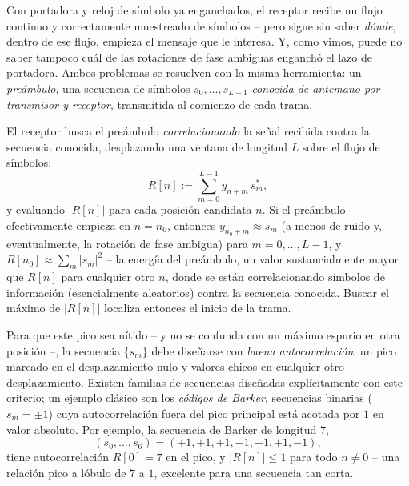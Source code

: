 Con portadora y reloj de símbolo ya enganchados, el receptor recibe un flujo continuo y correctamente muestreado de símbolos -- pero sigue sin saber \emph{dónde}, dentro de ese flujo, empieza el mensaje que le interesa. Y, como vimos, puede no saber tampoco cuál de las rotaciones de fase ambiguas enganchó el lazo de portadora. Ambos problemas se resuelven con la misma herramienta: un \emph{preámbulo}, una secuencia de símbolos $s_0,\ldots,s_{L-1}$ \emph{conocida de antemano por transmisor y receptor}, transmitida al comienzo de cada trama.

El receptor busca el preámbulo \emph{correlacionando} la señal recibida contra la secuencia conocida, desplazando una ventana de longitud $L$ sobre el flujo de símbolos:
\begin{equation*}
    R[n] := \sum_{m=0}^{L-1} y_{n+m}\, s_m^*,
\end{equation*}
y evaluando $|R[n]|$ para cada posición candidata $n$. Si el preámbulo efectivamente empieza en $n=n_0$, entonces $y_{n_0+m}\approx s_m$ (a menos de ruido y, eventualmente, la rotación de fase ambigua) para $m=0,\ldots,L-1$, y $R[n_0]\approx\sum_m |s_m|^2$ -- la energía del preámbulo, un valor sustancialmente mayor que $R[n]$ para cualquier otro $n$, donde se están correlacionando símbolos de información (esencialmente aleatorios) contra la secuencia conocida. Buscar el máximo de $|R[n]|$ localiza entonces el inicio de la trama.

Para que este pico sea nítido -- y no se confunda con un máximo espurio en otra posición --, la secuencia $\{s_m\}$ debe diseñarse con \emph{buena autocorrelación}: un pico marcado en el desplazamiento nulo y valores chicos en cualquier otro desplazamiento. Existen familias de secuencias diseñadas explícitamente con este criterio; un ejemplo clásico son los \emph{códigos de Barker}, secuencias binarias ($s_m=\pm 1$) cuya autocorrelación fuera del pico principal está acotada por $1$ en valor absoluto. Por ejemplo, la secuencia de Barker de longitud $7$,
\begin{equation*}
    (s_0,\ldots,s_6) = (+1,+1,+1,-1,-1,+1,-1),
\end{equation*}
tiene autocorrelación $R[0]=7$ en el pico, y $|R[n]|\leqslant 1$ para todo $n\neq 0$ -- una relación pico a lóbulo de $7$ a $1$, excelente para una secuencia tan corta.

